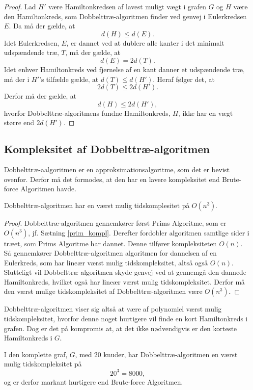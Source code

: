 \begin{proof}
Lad $H'$ være Hamiltonkredsen af lavest muligt vægt i grafen $G$ og $H$ være den Hamiltonkreds, som Dobbelttræ-algoritmen finder ved genvej i Eulerkredsen $E$. Da må der gælde, at $$d(H)\leq d(E).$$ 
Idet Eulerkredsen, $E$, er dannet ved at dublere alle kanter i det minimalt udspændende træ, $T$, må der gælde, at $$d(E) = 2d(T).$$
Idet enhver Hamiltonkreds ved fjernelse af en kant danner et udspændende træ, må der i $H'$'s tilfælde gælde, at $d(T) \leq d(H')$. Heraf følger det, at $$2d(T) \leq 2d(H').$$
Derfor må der gælde, at $$d(H) \leq 2d(H'),$$ hvorfor Dobbelttræ-algoritmens fundne Hamiltonkreds, $H$, ikke har en vægt større end $2d(H')$. 
\end{proof}

\subsection{Kompleksitet af Dobbelttræ-algoritmen}
Dobbelttræ-aalgoritmen er en approksimationsalgoritme, som det er bevist ovenfor. Derfor må det formodes, at den har en lavere kompleksitet end Brute-force Algoritmen havde.

\begin{thm}
Dobbelttræ-algoritmen har en værst mulig tidskomplesitet på $O(n^3)$.
\end{thm}

\begin{proof}
Dobbelttræ-algoritmen gennemkører først Prims Algoritme, som er $O(n^3)$, jf. Sætning \ref{prim_kompl}. 
Derefter fordobler algoritmen samtlige sider i træet, som Prims Algoritme har dannet. Denne tilfører kompleksiteten $O(n)$.
Så gennemkører Dobbelttræ-algoritmen algoritmen for dannelsen af en Eulerkreds, som har lineær værst mulig tidskompleksitet, altså også $O(n)$.
Slutteligt vil Dobbelttræ-algoritmen skyde genvej ved at gennemgå den dannede Hamiltonkreds, hvilket også har lineær værst mulig tidskompleksitet. 
Derfor må den værst mulige tidskompleksitet af Dobbelttræ-algoritmen være $O(n^3)$.
\end{proof}

Dobbelttræ-algoritmen viser sig altså at være af polynomiel værst mulig tidskompleksitet, hvorfor denne noget hurtigere vil finde en kort Hamiltonkreds i grafen. Dog er det på kompromis at, at det ikke nødvendigvis er den korteste Hamiltonkreds i $G$.

\begin{exmp}
I den komplette graf, $G$, med $20$ knuder, har Dobbelttræ-algoritmen en værst mulig tidskompleksitet på $$20^3 = 8000,$$ og er derfor markant hurtigere end Brute-force Algoritmen.
\end{exmp}




